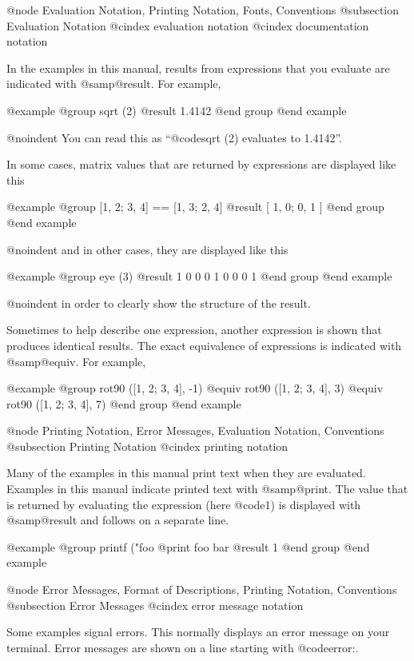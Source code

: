 {@node Evaluation Notation, Printing Notation, Fonts, Conventions
@subsection Evaluation Notation
@cindex evaluation notation
@cindex documentation notation

In the examples in this manual, results from expressions that you
evaluate are indicated with @samp{@result{}}.  For example,

@example
@group
sqrt (2)
     @result{} 1.4142
@end group
@end example

@noindent
You can read this as ``@code{sqrt (2)} evaluates to 1.4142''.

In some cases, matrix values that are returned by expressions are
displayed like this

@example
@group
[1, 2; 3, 4] == [1, 3; 2, 4]
     @result{} [ 1, 0; 0, 1 ]
@end group
@end example

@noindent
and in other cases, they are displayed like this

@example
@group
eye (3)
     @result{}  1  0  0
         0  1  0
         0  0  1
@end group
@end example

@noindent
in order to clearly show the structure of the result.

Sometimes to help describe one expression, another expression is
shown that produces identical results.  The exact equivalence of
expressions is indicated with @samp{@equiv{}}.  For example,

@example
@group
rot90 ([1, 2; 3, 4], -1)
@equiv{}
rot90 ([1, 2; 3, 4], 3)
@equiv{}
rot90 ([1, 2; 3, 4], 7)
@end group
@end example

@node Printing Notation, Error Messages, Evaluation Notation, Conventions
@subsection Printing Notation
@cindex printing notation

Many of the examples in this manual print text when they are
evaluated.  Examples in this manual indicate printed text with
@samp{@print{}}.  The value that is returned by evaluating the
expression (here @code{1}) is displayed with @samp{@result{}} and
follows on a separate line.

@example
@group
printf ("foo %
     @print{} foo bar
     @result{} 1
@end group
@end example

@node Error Messages, Format of Descriptions, Printing Notation, Conventions
@subsection Error Messages
@cindex error message notation

Some examples signal errors.  This normally displays an error message
on your terminal.  Error messages are shown on a line starting with
@code{error:}.

}
